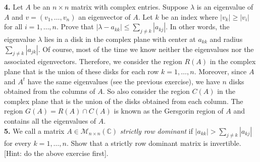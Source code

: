 \documentclass[11pt]{amsart}
\theoremstyle{definition}  %
\newcommand{\C}{\mathbb{C}}
\begin{document}
\vskip 0.1cm
\noindent
{\bf 4. } Let $A$ be an $n\times n$ matrix with complex entries. Suppose $\lambda$ is an eigenvalue of $A$ and $v = (v_1, \ldots, v_n)$ an eigenvector of $A$. Let $k$ be an index
where $|v_k| \geq |v_i|$ for all $i=1, \ldots, n$.  Prove that $|\lambda - a_{kk}| \leq \sum_{j \neq k} |a_{kj}|$. In other words, the eigenvalue $\lambda$ lies in a disk in the complex plane with 
center at $a_{kk}$ and radius $\sum_{j \neq k} |a_{jk}|$. Of course, most of the time we know neither the eigenvalues nor the associated eigenvectors. Therefore, we consider the
region $R(A)$ in the complex plane that is the union of these disks for each row $k=1, \ldots, n$. Moreover, since $A$ and $A^t$ have the same eigenvalues (see the previous exercise),
we have $n$ disks obtained from the columns of $A$. So also consider the region $C(A)$ in the complex plane that is the union of the disks obtained from each column. The region
$G(A) = R(A) \cap C(A)$ is known as the Gersgorin region of $A$ and contains all the eigenvalues of $A$. \\


\vskip 0.1cm
\noindent
{\bf 5.} We call a matrix $A \in \mathcal{M}_{n \times n}(\C)$ {\it strictly row dominant} if $|a_{kk}| > \sum_{j \neq k} |a_{kj}|$ for every $k =1, \ldots, n$. Show that a strictly
row dominant matrix is invertible. [Hint: do the above exercise first]. \\ 
\end{document}
